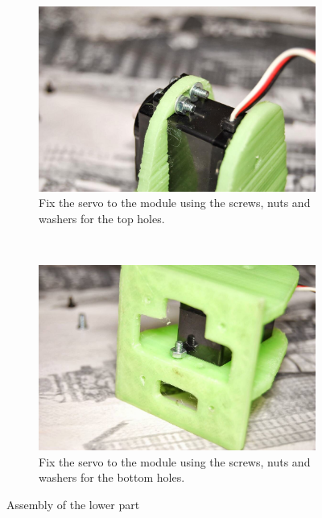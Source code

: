 \begin{figure}[H]
\begin{subfigure}[b]{0.46\textwidth}
        \end{subfigure}
        ~
        \begin{subfigure}[b]{0.46\textwidth}
                \centering
                \includegraphics[width=\textwidth]{images/REPY2_assembly_05.jpg}
                \caption{Fix the servo to the module using the screws, nuts and washers for the top holes.\\}
                \label{fig:hardware_assembly_05}
        \end{subfigure}
        ~
        \begin{subfigure}[b]{0.46\textwidth}
                \centering
                \includegraphics[width=\textwidth]{images/REPY2_assembly_06.jpg}
                \caption{Fix the servo to the module using the screws, nuts and washers for the bottom holes.\\}
                \label{fig:hardware_assembly_06}
        \end{subfigure}
        \caption{Assembly of the lower part} 
        \label{fig:hardware_assembly_lower}
\end{figure}

